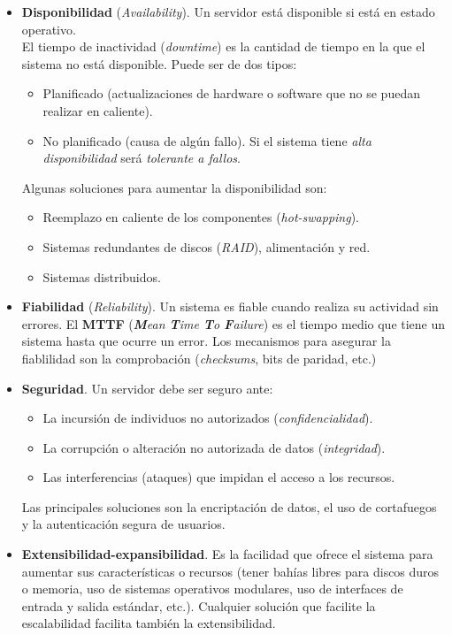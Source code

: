 \documentclass[12pt,spanish]{article}
\begin{document}
\begin{itemize}
	\item \textbf{Disponibilidad} (\textit{Availability}). Un servidor está disponible si está en estado operativo.\\ El tiempo de inactividad (\textit{downtime}) es la cantidad de tiempo en la que el sistema no está disponible. Puede ser de dos tipos:
	\begin{itemize}
		\item Planificado (actualizaciones de hardware o software que no se puedan realizar en caliente).
		\item No planificado (causa de algún fallo). Si el sistema tiene \emph{alta disponibilidad} será \emph{tolerante a fallos}.
	\end{itemize}
	\newpage
	Algunas soluciones para aumentar la disponibilidad son:
	\begin{itemize}
		\item Reemplazo en caliente de los componentes (\textit{hot-swapping}).
		\item Sistemas redundantes de discos (\textit{RAID}), alimentación y red.
		\item Sistemas distribuidos.
	\end{itemize}
	\item \textbf{Fiabilidad} (\textit{Reliability}). Un sistema es fiable cuando realiza su actividad sin errores. El \textbf{MTTF} (\textit{\textbf{M}ean \textbf{T}ime \textbf{T}o \textbf{F}ailure}) es el tiempo medio que tiene un sistema hasta que ocurre un error. Los mecanismos para asegurar la fiablilidad son la comprobación (\textit{checksums}, bits de paridad, etc.)
	\item \textbf{Seguridad}. Un servidor debe ser seguro ante:
	\begin{itemize}
		\item La incursión de individuos no autorizados (\textit{confidencialidad}).
		\item La corrupción o alteración no autorizada de datos (\textit{integridad}).
		\item Las interferencias (ataques) que impidan el acceso a los recursos.
	\end{itemize}
	Las principales soluciones son la encriptación de datos, el uso de cortafuegos y la autenticación segura de usuarios.
	\item \textbf{Extensibilidad-expansibilidad}. Es la facilidad que ofrece el sistema para aumentar sus características o recursos (tener bahías libres para discos duros o memoria, uso de sistemas operativos modulares, uso de interfaces de entrada y salida estándar, etc.). Cualquier solución que facilite la escalabilidad facilita también la extensibilidad.

\end{itemize}
\end{document}
